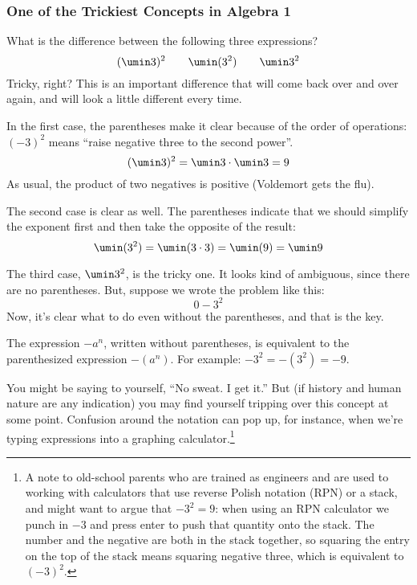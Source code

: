 \subsubsection*{One of the Trickiest Concepts in Algebra 1}

What is the difference between the following three expressions? \[(\umin3)^2 \qquad \umin(3^2) \qquad \umin3^2\]
Tricky, right? This is an important difference that will come back over and over again, and will look a little different every time.

In the first case, the parentheses make it clear because of the order of operations: $(-3)^2$ means ``raise negative three to the second power''.\[(\umin3)^2 = \umin3 \cdot \umin3 = 9\]As usual, the product of two negatives is positive (Voldemort gets the flu).


The second case is clear as well. The parentheses indicate that we should simplify the exponent first and then take the opposite of the result: \[\umin(3^2) = \umin(3\cdot3) = \umin(9) = \umin9\]

The third case, $\umin3^2$,  is the tricky one. It looks kind of ambiguous, since there are no parentheses. But, suppose we wrote the problem like this:
\[0 - 3^2\] Now, it's clear what to do even without the parentheses, and that is the key.

\begin{boxeddef}
The expression $-a^n$, written without parentheses, is equivalent to the parenthesized expression $-(a^n)$. For example: $-3^2 = -(3^2) = -9$.
\end{boxeddef}

You might be saying to yourself, ``No sweat. I get it.'' But (if history and human nature are any indication) you may find yourself tripping over this concept at some point. Confusion around the notation can pop up, for instance, when we're typing expressions into a graphing calculator.\footnote{A note to old-school parents who are trained as engineers and are used to working with calculators that use reverse Polish notation (RPN) or a stack, and might want to argue that $-3^2 = 9$: when using an RPN calculator we punch in $-3$ and press enter to push that quantity onto the stack. The number and the negative are both in the stack together, so squaring the entry on the top of the stack means squaring negative three, which is equivalent to $(-3)^2$.}

